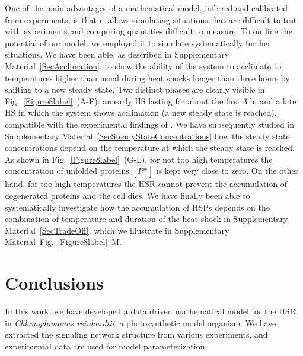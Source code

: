 \documentclass[oneside, 10pt, a4paper, twocolumn]{article}
\begin{document}
One of the main advantages of a mathematical model, inferred and calibrated from experiments, is that it allows simulating situations that are difficult to test with experiments and computing quantities difficult to measure. To outline the potential of our model, we {employed} it to simulate {systematically} further situations. 
We have been able, as described in {Supplementary Material~\ref{SecAcclimation}}, to show the ability of the system to {acclimate} to temperatures higher than usual during heat shocks longer than three hours by shifting to a new steady state. Two distinct phases are clearly visible in Fig.~\ref{Figure8label}~(A-F): an early HS lasting for about the first $3$ h, and a late HS in which the system shows {acclimation} (a new steady state is reached), compatible with the experimental findings of \cite{Hemme2014}. We have subsequently studied in Supplementary Material~\ref{SecSteadyStateConcentrations} how the steady state concentrations depend on the temperature at which the steady state is reached. As shown in Fig.~\ref{Figure8label}~(G-L), for not too high temperatures the concentration of unfolded proteins $\left[P^\#\right]$ is kept very close to zero. On the other hand, for too high temperatures the HSR cannot prevent the accumulation of degenerated proteins and the cell dies. 
We have finally been able to systematically investigate how the accumulation of HSPs depends on the combination of temperature and duration of the heat shock in Supplementary Material~\ref{SecTradeOff}, {which we illustrate in Supplementary Material~Fig.~\ref{Figure8label}~M.} 






\section{Conclusions}
\label{SectionConclusions}

In this work, we have developed a data driven mathematical model for the HSR in \emph{Chlamydomonas {reinhardtii}}, a photosynthetic model organism. We have extracted the signaling network structure from various experiments, and experimental data are used for model parameterization.
\end{document}
